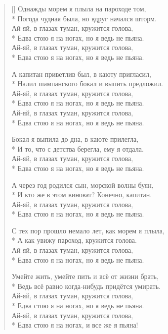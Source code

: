\documentclass[a4paper,oneside,14pt]{scrbook}
\begin{document}
    \settowidth{\versewidth}{Ай-яй, в глазах туман, кружится голова,}
    \begin{verse}[\versewidth]
        Однажды морем я плыла на пароходе том,\\*
        Погода чудная была, но вдруг начался шторм.\\
        
        \vin Ай-яй, в глазах туман, кружится голова,\\*
        \vin Едва стою я на ногах, но я ведь не пьяна.\\
        \vin Ай-яй, в глазах туман, кружится голова,\\*
        \vin Едва стою я на ногах, но я ведь не пьяна. 

        А капитан приветлив был, в каюту пригласил,\\*
        Налил шампанского бокал и выпить предложил.\\

        \vin Ай-яй, в глазах туман, кружится голова,\\*
        \vin Едва стою я на ногах, но я ведь не пьяна.\\
        \vin Ай-яй, в глазах туман, кружится голова,\\*
        \vin Едва стою я на ногах, но я ведь не пьяна.

        Бокал я выпила до дна, в каюте прилегла,\\*
        И то, что с детства берегла, ему я отдала.\\

        \vin Ай-яй, в глазах туман, кружится голова,\\*
        \vin Едва стою я на ногах, но я ведь не пьяна.

        А через год родился сын, морской волны буян,\\*
        И кто же в этом виноват? Конечно, капитан.\\

        \vin Ай-яй, в глазах туман, кружится голова,\\*
        \vin Едва стою я на ногах, но я ведь не пьяна.

        С тех пор прошло немало лет, как морем я плыла,\\*
        А как увижу пароход, кружится голова.\\

        \vin Ай-яй, в глазах туман, кружится голова,\\*
        \vin Едва стою я на ногах, но я ведь не пьяна.

        Умейте жить, умейте пить и всё от жизни брать,\\*
        Ведь всё равно когда-нибудь придётся умирать.\\

        \vin Ай-яй, в глазах туман, кружится голова,\\*
        \vin Едва стою я на ногах, но я ведь не пьяна.\\
        \vin Ай-яй, в глазах туман, кружится голова,\\*
        \vin Едва стою я на ногах, и все же я пьяна!
    \end{verse}
    
\end{document}

